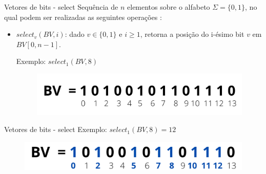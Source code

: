     \begin{frame}{Vetores de bits - select}
    Sequência de $n$ elementos sobre o alfabeto $\Sigma = \{0,1\}$, no qual podem ser realizadas as seguintes operações \citep{book-compact-data-structures}:
        \vspace{0.5cm}
        \begin{itemize} 
              \item $select_v(BV,i)$: dado $v \in \{0,1\}$ e $i \geq 1$, retorna a posição do i-ésimo bit $v$ em $BV[0,n-1]$.
              \vspace{0.5cm}
            
                Exemplo: $select_1(BV,8)$
            
                \begin{figure}[h!]
                    \centering
                    \includegraphics[scale=0.5]{images/bitvector.png}
                \end{figure} 
        \end{itemize}
    \end{frame}
    
    \begin{frame}{Vetores de bits - select}
        Exemplo: $select_1(BV,8)=12$
        \begin{figure}[h!]
            \centering
            \includegraphics[scale=0.7]{images/select-res.png}
        \end{figure} 
    \end{frame}